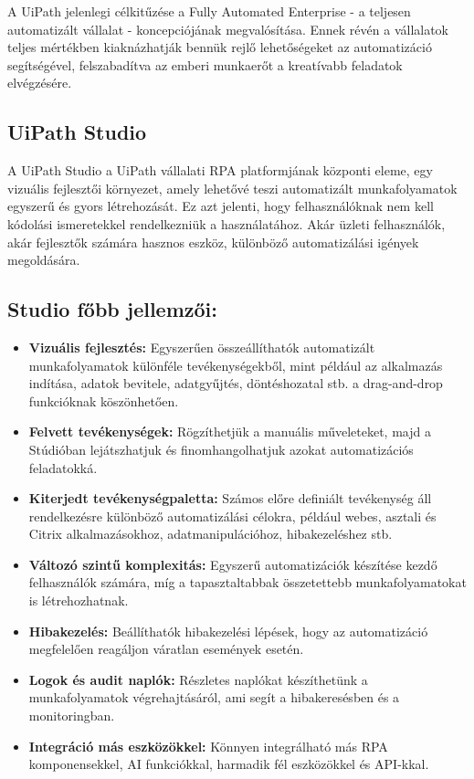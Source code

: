 \documentclass[
]{thesis-ekf}
\theoremstyle{definition}
\theoremstyle{remark}
\begin{document}
A UiPath jelenlegi célkitűzése a Fully Automated Enterprise - a teljesen automatizált vállalat - koncepciójának megvalósítása. Ennek révén a vállalatok teljes mértékben kiaknázhatják bennük rejlő lehetőségeket az automatizáció segítségével, felszabadítva az emberi munkaerőt a kreatívabb feladatok elvégzésére.

\subsection{ UiPath Studio \cite{Studio}}
A UiPath Studio a UiPath vállalati RPA platformjának központi eleme, egy vizuális fejlesztői környezet, amely lehetővé teszi automatizált munkafolyamatok egyszerű és gyors létrehozását. Ez azt jelenti, hogy felhasználóknak nem kell kódolási ismeretekkel rendelkezniük a használatához. Akár üzleti felhasználók, akár fejlesztők számára hasznos eszköz, különböző automatizálási igények megoldására.
\subsection*{Studio főbb jellemzői:}
	\begin{itemize}
		\item \textbf{Vizuális fejlesztés:} Egyszerűen összeállíthatók automatizált munkafolyamatok különféle tevékenységekből, mint például az alkalmazás indítása, adatok bevitele, adatgyűjtés, döntéshozatal stb. a drag-and-drop funkcióknak köszönhetően.
		
		\item \textbf{Felvett tevékenységek:} Rögzíthetjük a manuális műveleteket, majd a Stúdióban lejátszhatjuk és finomhangolhatjuk azokat automatizációs feladatokká.
				
		\item \textbf{Kiterjedt tevékenységpaletta:} Számos előre definiált tevékenység áll rendelkezésre különböző automatizálási célokra, például webes, asztali és Citrix alkalmazásokhoz, adatmanipulációhoz, hibakezeléshez stb.
		
		
		\item \textbf{Változó szintű komplexitás:} Egyszerű automatizációk készítése kezdő felhasználók számára, míg a tapasztaltabbak összetettebb munkafolyamatokat is létrehozhatnak.
		
		\item \textbf{Hibakezelés:} Beállíthatók hibakezelési lépések, hogy az automatizáció megfelelően reagáljon váratlan események esetén.
		
		\item \textbf{Logok és audit naplók:} Részletes naplókat készíthetünk a munkafolyamatok végrehajtásáról, ami segít a hibakeresésben és a monitoringban.
		
		\item \textbf{Integráció más eszközökkel:} Könnyen integrálható más RPA komponensekkel, AI funkciókkal, harmadik fél eszközökkel és API-kkal.
		
	\end{itemize}
\end{document}
